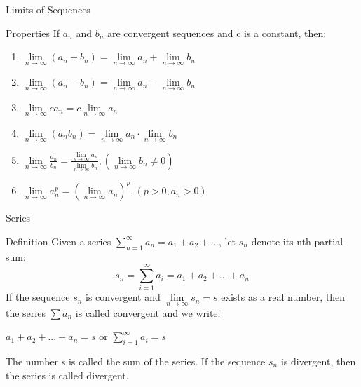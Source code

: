 \begin{frame}{Limits of Sequences}
    \begin{block}{Properties}
        If {$a_n$} and {$b_n$} are convergent sequences and c is a constant, then:
        \begin{enumerate}
            \item $\mathop{lim} \limits_{n \rightarrow \infty}(a_n+b_n)=\mathop{lim} \limits_{n \rightarrow \infty} a_n+ \mathop{lim} \limits_{n \rightarrow \infty}b_n$
            \item $\mathop{lim} \limits_{n \rightarrow \infty}(a_n-b_n)=\mathop{lim} \limits_{n \rightarrow \infty} a_n- \mathop{lim} \limits_{n \rightarrow \infty}b_n$
            \item $\mathop{lim} \limits_{n \rightarrow \infty} c a_n= c\mathop{lim} \limits_{n \rightarrow \infty} a_n$
            \item $\mathop{lim} \limits_{n \rightarrow \infty}(a_n b_n)=\mathop{lim} \limits_{n \rightarrow \infty}a_n \cdot \mathop{lim} \limits_{n \rightarrow \infty} b_n$
            \item $\mathop{lim} \limits_{n \rightarrow \infty}\frac{a_n}{b_n} =\frac{\mathop{lim} \limits_{n \rightarrow \infty} a_n}{\mathop{lim} \limits_{n \rightarrow \infty}b_n},(\mathop{lim} \limits_{n \rightarrow \infty}b_n \neq 0)$
            \item $\mathop{lim} \limits_{n \rightarrow \infty} a_n ^p = (\mathop{lim} \limits_{n \rightarrow \infty} a_n)^p,(p>0, a_n>0)$
        \end{enumerate}
    \end{block}
\end{frame}





\begin{frame}{Series}
    \begin{block}{Definition}
        Given a series $\sum\limits_{n=1}^{\infty} a_n = a_1 + a_2 + ...$, let $s_n$ denote  its nth partial sum:\\
        $$s_n=\sum\limits_{i=1}^{\infty} a_i = a_1 + a_2 + ...+a_n$$
        If the sequence {$s_n$} is convergent and $\mathop{lim} \limits_{n \rightarrow \infty}  s_n = s$ exists as a real number, then the series $\sum a_n$ is called convergent and we write:\\
        \begin{center}
            $a_1+a_2+...+a_n=s$ or $\sum\limits_{i=1}^{\infty} a_i= s$
        \end{center}
        The number s is called the sum of the series. If the sequence {$s_n$} is divergent, then the series is called divergent.
    \end{block}
\end{frame}



